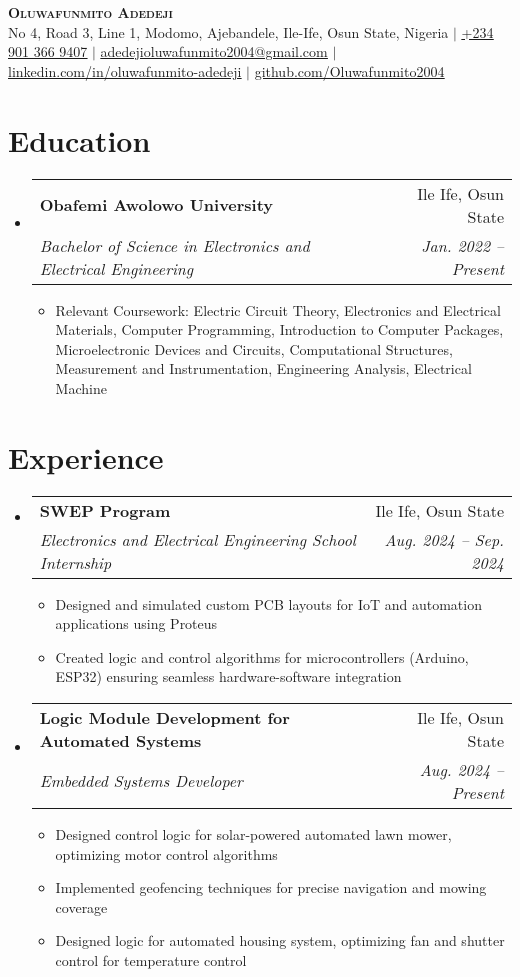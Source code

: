 \documentclass[letterpaper,11pt]{article}
\makeatletter
\newcommand{\resumeItem}[1]{
  \item\small{
    {#1 \vspace{-2pt}}
  }
}
\newcommand{\resumeSubheading}[4]{
  \vspace{-2pt}\item
    \begin{tabular*}{0.97\textwidth}[t]{l@{\extracolsep{\fill}}r}
      \textbf{#1} & #2 \\
      \textit{\small#3} & \textit{\small #4} \\
    \end{tabular*}\vspace{-7pt}
}
\newcommand{\resumeSubHeadingListStart}{\begin{itemize}[leftmargin=0.15in, label={}]}
\newcommand{\resumeSubHeadingListEnd}{\end{itemize}}
\newcommand{\resumeItemListStart}{\begin{itemize}}
\newcommand{\resumeItemListEnd}{\end{itemize}\vspace{-5pt}}
\makeatother
\begin{document}
\begin{center}
    \textbf{\Huge \scshape Oluwafunmito Adedeji} \\ \vspace{1pt}
    \small No 4, Road 3, Line 1, Modomo, Ajebandele, Ile-Ife, Osun State, Nigeria $|$ 
    \href{tel:+2349013669407}{\underline{+234 901 366 9407}} $|$ 
    \href{mailto:adedejioluwafunmito2004@gmail.com}{\underline{adedejioluwafunmito2004@gmail.com}} $|$
    \href{https://linkedin.com/in/oluwafunmito-adedeji-675b96305}{\underline{linkedin.com/in/oluwafunmito-adedeji}} $|$
    \href{https://github.com/Oluwafunmito2004}{\underline{github.com/Oluwafunmito2004}}
\end{center}

\section{Education}
  \resumeSubHeadingListStart
    \resumeSubheading
      {Obafemi Awolowo University}{Ile Ife, Osun State}
      {Bachelor of Science in Electronics and Electrical Engineering}{Jan. 2022 -- Present}
      \resumeItemListStart
        \resumeItem{Relevant Coursework: Electric Circuit Theory, Electronics and Electrical Materials, Computer Programming, Introduction to Computer Packages, Microelectronic Devices and Circuits, Computational Structures, Measurement and Instrumentation, Engineering Analysis, Electrical Machine}
      \resumeItemListEnd
  \resumeSubHeadingListEnd

\section{Experience}
  \resumeSubHeadingListStart
    \resumeSubheading
      {SWEP Program}{Ile Ife, Osun State}
      {Electronics and Electrical Engineering School Internship}{Aug. 2024 -- Sep. 2024}
      \resumeItemListStart
        \resumeItem{Designed and simulated custom PCB layouts for IoT and automation applications using Proteus}
        \resumeItem{Created logic and control algorithms for microcontrollers (Arduino, ESP32) ensuring seamless hardware-software integration }
      \resumeItemListEnd
      
    \resumeSubheading
      {Logic Module Development for Automated Systems}{Ile Ife, Osun State}
      {Embedded Systems Developer}{Aug. 2024 -- Present}
      \resumeItemListStart
        \resumeItem{Designed control logic for solar-powered automated lawn mower, optimizing motor control algorithms}
        \resumeItem{Implemented geofencing techniques for precise navigation and mowing coverage}
        \resumeItem{Designed logic for automated housing system, optimizing fan and shutter control for temperature control}
      \resumeItemListEnd
  \resumeSubHeadingListEnd
\end{document}
